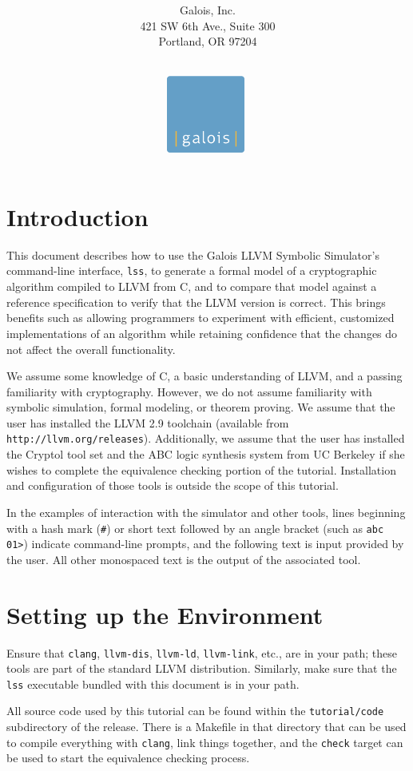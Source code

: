 \documentclass[11pt]{article}
\title{\LARGE{\bf \titleline}}
\author{\\$ $\\$ $\\
        Galois, Inc.\\
        421 SW 6th Ave., Suite 300\\Portland, OR 97204}
\date{
\vspace*{2cm}$ $\\
\includegraphics[height=1in]{images/Galois_logo_blue_box.pdf}
\vspace*{2cm}$ $\\
}
\begin{document}
\maketitle
\thispagestyle{empty}
\newpage

\section{Introduction}

This document describes how to use the Galois LLVM Symbolic Simulator's
command-line interface, \texttt{lss}, to generate a formal model of a
cryptographic algorithm compiled to LLVM from C, and to compare that
model against a reference specification to verify that the LLVM version
is correct. This brings benefits such as allowing programmers to
experiment with efficient, customized implementations of an algorithm
while retaining confidence that the changes do not affect the overall
functionality.

We assume some knowledge of C, a basic understanding of LLVM, and a
passing familiarity with cryptography. However, we do not assume
familiarity with symbolic simulation, formal modeling, or theorem
proving.  We assume that the user has installed the LLVM 2.9 toolchain
(available from \texttt{http://llvm.org/releases}).  Additionally, we
assume that the user has installed the Cryptol tool set and the ABC
logic synthesis system from UC Berkeley if she wishes to complete the
equivalence checking portion of the tutorial.  Installation and
configuration of those tools is outside the scope of this tutorial.

In the examples of interaction with the simulator and other tools, lines
beginning with a hash mark (\texttt{\#}) or short text followed by an
angle bracket (such as \texttt{abc 01>}) indicate command-line prompts,
and the following text is input provided by the user. All other
monospaced text is the output of the associated tool.

\section{Setting up the Environment}
\label{sec:setup}
 
Ensure that \texttt{clang}, \texttt{llvm-dis}, \texttt{llvm-ld},
\texttt{llvm-link}, etc., are in your path; these tools are part of the
standard LLVM distribution.  Similarly, make sure that the \texttt{lss}
executable bundled with this document is in your path.

All source code used by this tutorial can be found within the
\texttt{tutorial/code} subdirectory of the release.  There is a Makefile
in that directory that can be used to compile everything with
\texttt{clang}, link things together, and the \texttt{check} target can
be used to start the equivalence checking process.
\end{document}
